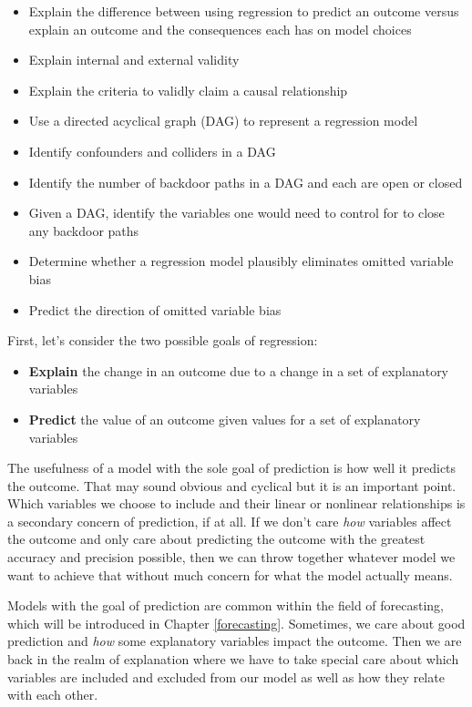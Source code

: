 \documentclass[
]{book}
\providecommand{\tightlist}{%
  \setlength{\itemsep}{0pt}\setlength{\parskip}{0pt}}
\newenvironment{learncheck}%
{%
  \par\vspace{\baselineskip}\noindent 
  \color{Exercise}\begin{itshape}%
  \par\vspace{\baselineskip}\noindent\ignorespaces 
}%
{%
  \end{itshape}\ignorespacesafterend 
}
\begin{document}
\begin{learncheck}
\begin{itemize}
\tightlist
\item
  Explain the difference between using regression to predict an outcome
  versus explain an outcome and the consequences each has on model
  choices
\item
  Explain internal and external validity
\item
  Explain the criteria to validly claim a causal relationship
\item
  Use a directed acyclical graph (DAG) to represent a regression model
\item
  Identify confounders and colliders in a DAG
\item
  Identify the number of backdoor paths in a DAG and each are open or
  closed
\item
  Given a DAG, identify the variables one would need to control for to
  close any backdoor paths
\item
  Determine whether a regression model plausibly eliminates omitted
  variable bias
\item
  Predict the direction of omitted variable bias
\end{itemize}
\end{learncheck}

First, let's consider the two possible goals of regression:

\begin{itemize}
\tightlist
\item
  \textbf{Explain} the change in an outcome due to a change in a set of explanatory variables
\item
  \textbf{Predict} the value of an outcome given values for a set of explanatory variables
\end{itemize}

The usefulness of a model with the sole goal of prediction is how well it predicts the outcome. That may sound obvious and cyclical but it is an important point. Which variables we choose to include and their linear or nonlinear relationships is a secondary concern of prediction, if at all. If we don't care \emph{how} variables affect the outcome and only care about predicting the outcome with the greatest accuracy and precision possible, then we can throw together whatever model we want to achieve that without much concern for what the model actually means.

Models with the goal of prediction are common within the field of forecasting, which will be introduced in Chapter \ref{forecasting}. Sometimes, we care about good prediction and \emph{how} some explanatory variables impact the outcome. Then we are back in the realm of explanation where we have to take special care about which variables are included and excluded from our model as well as how they relate with each other.
\end{document}
